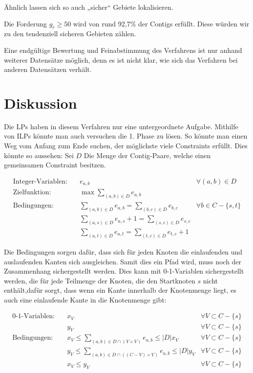 Ähnlich lassen sich so auch „sicher“ Gebiete lokalisieren.

Die Forderung $g_r \geq 50$ wird von rund 92,7\% der Contigs erfüllt. Diese würden wir zu den tendenziell sicheren Gebieten zählen.

Eine endgültige Bewertung und Feinabstimmung des Verfahrens ist nur anhand weiterer Datensätze möglich, denn es ist nicht klar, wie sich das Verfahren bei anderen Datensätzen verhält.
\section{Diskussion}
Die LPs haben in diesem Verfahren nur eine untergeordnete Aufgabe. Mithilfe von ILPs könnte man auch versuchen die 1. Phase zu lösen.
So könnte man einen Weg vom Anfang zum Ende suchen, der möglichste viele Constraints erfüllt. 
Dies könnte so aussehen: Sei $D$ Die Menge der Contig-Paare, welche einen gemeinsamen Constraint besitzen.

\begin{align*}
\text{Integer-Variablen:}\quad& e_{a,b} &\forall (a,b) \in D\\
\text{Zielfunktion:}\quad& \max \sum_{(a,b) \in D} e_{a,b}\\
\text{Bedingungen:}\quad& \sum_{(a,b) \in D} e_{a,b} = \sum_{(b,c) \in D} e_{b,c} &\forall b \in C-\{s,t\}\\
& \sum_{(a,s) \in D} e_{a,s}+1 = \sum_{(s,c) \in D} e_{s,c}\\
& \sum_{(a,t) \in D} e_{a,t} = \sum_{(t,c) \in D} e_{t,c} +1
\end{align*}

Die Bedingungen sorgen dafür, dass sich für jeden Knoten die einlaufenden und auslaufenden Kanten sich ausgleichen. Samit dies ein Pfad wird, muss noch der Zusammenhang sichergestellt werden. Dies kann mit 0-1-Variablen sichergestellt werden, die für jede Teilmenge der Knoten, die den Startknoten $s$ nicht enthält,dafür sorgt, dass wenn ein Kante innerhalb der Knotenmenge liegt, es auch eine einlaufende Kante in die Knotenmenge gibt:

\begin{align*}
\text{0-1-Variablen:}\quad& x_V &\forall V \subset C-\{s\}\\
\quad& y_V &\forall V \subset C-\{s\}\\
\text{Bedingungen:}\quad&  x_V \leq \sum_{(a,b) \in D \cap (V \times V)}  e_{a,b} \leq |D| x_V  &\forall V \subset C-\{s\}\\
\quad&  y_V \leq \sum_{(a,b) \in D \cap ((C-V) \times V)}  e_{a,b} \leq |D| y_V  &\forall V \subset C-\{s\}\\
\quad&  x_V \leq y_V  &\forall V \subset C-\{s\}
\end{align*}

